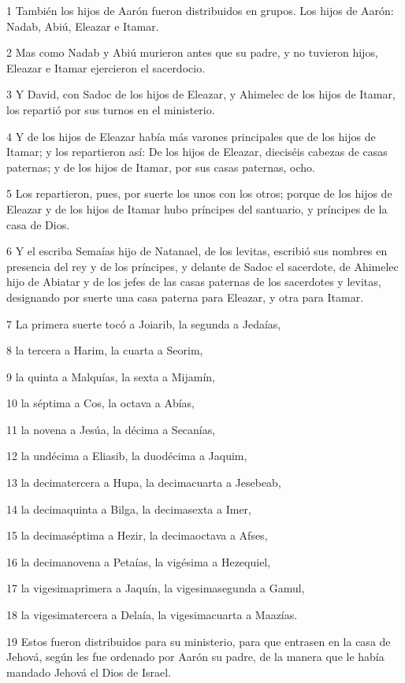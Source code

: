 \par 1 También los hijos de Aarón fueron distribuidos en grupos. Los hijos de Aarón: Nadab, Abiú, Eleazar e Itamar.
\par 2 Mas como Nadab y Abiú murieron antes que su padre, y no tuvieron hijos, Eleazar e Itamar ejercieron el sacerdocio.
\par 3 Y David, con Sadoc de los hijos de Eleazar, y Ahimelec de los hijos de Itamar, los repartió por sus turnos en el ministerio.
\par 4 Y de los hijos de Eleazar había más varones principales que de los hijos de Itamar; y los repartieron así: De los hijos de Eleazar, dieciséis cabezas de casas paternas; y de los hijos de Itamar, por sus casas paternas, ocho.
\par 5 Los repartieron, pues, por suerte los unos con los otros; porque de los hijos de Eleazar y de los hijos de Itamar hubo príncipes del santuario, y príncipes de la casa de Dios.
\par 6 Y el escriba Semaías hijo de Natanael, de los levitas, escribió sus nombres en presencia del rey y de los príncipes, y delante de Sadoc el sacerdote, de Ahimelec hijo de Abiatar y de los jefes de las casas paternas de los sacerdotes y levitas, designando por suerte una casa paterna para Eleazar, y otra para Itamar.
\par 7 La primera suerte tocó a Joiarib, la segunda a Jedaías,
\par 8 la tercera a Harim, la cuarta a Seorim,
\par 9 la quinta a Malquías, la sexta a Mijamín,
\par 10 la séptima a Cos, la octava a Abías,
\par 11 la novena a Jesúa, la décima a Secanías,
\par 12 la undécima a Eliasib, la duodécima a Jaquim,
\par 13 la decimatercera a Hupa, la decimacuarta a Jesebeab,
\par 14 la decimaquinta a Bilga, la decimasexta a Imer,
\par 15 la decimaséptima a Hezir, la decimaoctava a Afses,
\par 16 la decimanovena a Petaías, la vigésima a Hezequiel,
\par 17 la vigesimaprimera a Jaquín, la vigesimasegunda a Gamul,
\par 18 la vigesimatercera a Delaía, la vigesimacuarta a Maazías.
\par 19 Estos fueron distribuidos para su ministerio, para que entrasen en la casa de Jehová, según les fue ordenado por Aarón su padre, de la manera que le había mandado Jehová el Dios de Israel.
